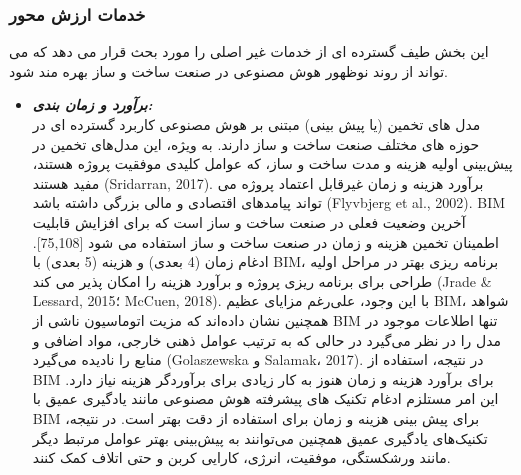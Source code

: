 \documentclass[towcolumn, 11pt]{Article}
\begin{document}
\begin{چکیده}
\subsubsection{خدمات ارزش محور}
این بخش طیف گسترده ای از خدمات غیر اصلی را مورد بحث قرار می دهد که می تواند از روند نوظهور هوش مصنوعی در صنعت ساخت و ساز بهره مند شود.

\begin{itemize}
\item
\textbf{\emph{برآورد و زمان بندی:}}
\\مدل های تخمین (یا پیش بینی) مبتنی بر هوش مصنوعی کاربرد گسترده ای در حوزه های مختلف صنعت ساخت و ساز دارند. به ویژه، این مدل‌های تخمین در پیش‌بینی اولیه هزینه و مدت ساخت و ساز، که عوامل کلیدی موفقیت پروژه هستند، مفید هستند (Sridarran, 2017). برآورد هزینه و زمان غیرقابل اعتماد پروژه می تواند پیامدهای اقتصادی و مالی بزرگی داشته باشد (Flyvbjerg et al., 2002).
BIM آخرین وضعیت فعلی در صنعت ساخت و ساز است که برای افزایش قابلیت اطمینان تخمین هزینه و زمان در صنعت ساخت و ساز استفاده می شود [75,108]. ادغام زمان (4 بعدی) و هزینه (5 بعدی) با BIM، برنامه ریزی بهتر در مراحل اولیه طراحی برای برنامه ریزی پروژه و برآورد هزینه را امکان پذیر می کند (Jrade & Lessard, 2015؛ McCuen, 2018). با این وجود، علی‌رغم مزایای عظیم BIM، شواهد همچنین نشان داده‌اند که مزیت اتوماسیون ناشی از BIM تنها اطلاعات موجود در مدل را در نظر می‌گیرد در حالی که به ترتیب عوامل ذهنی خارجی، مواد اضافی و منابع را نادیده می‌گیرد (Golaszewska و Salamak، 2017). در نتیجه، استفاده از BIM برای برآورد هزینه و زمان هنوز به کار زیادی برای برآوردگر هزینه نیاز دارد.
این امر مستلزم ادغام تکنیک های پیشرفته هوش مصنوعی مانند یادگیری عمیق با BIM برای پیش بینی هزینه و زمان برای استفاده از دقت بهتر است. در نتیجه، تکنیک‌های یادگیری عمیق همچنین می‌توانند به پیش‌بینی بهتر عوامل مرتبط دیگر مانند ورشکستگی، موفقیت، انرژی، کارایی کربن و حتی اتلاف کمک کنند.


\end{itemize}
\end{چکیده}
\end{document}
